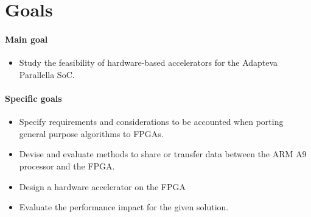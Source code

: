 \documentclass[11pt,letterpaper]{article}
\begin{document}



\section{Goals}

\paragraph{Main goal}
\begin{itemize}
\item Study the feasibility of hardware-based accelerators for the Adapteva Parallella SoC.
\end{itemize}

\paragraph{Specific goals}
\begin{itemize}
    \item Specify requirements and considerations to be accounted when porting general purpose algorithms to FPGAs.
    \item Devise and evaluate methods to share or transfer data between the ARM A9 processor and the FPGA. 
    \item Design a hardware accelerator on the FPGA
    \item Evaluate the performance impact for the given solution.
\end{itemize}
\end{document}
